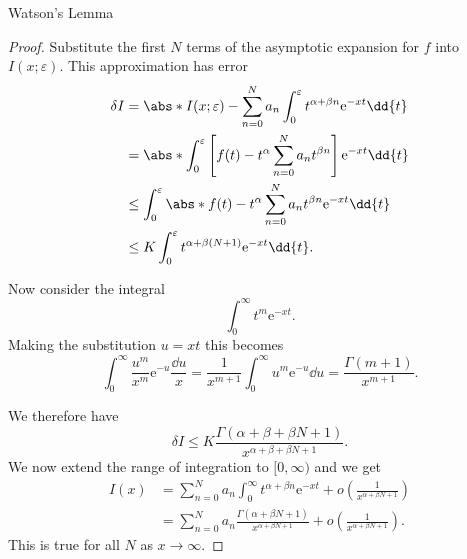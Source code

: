 \documentclass[fleqn]{NotesClass}
\newcommand*{\e}{\mathrm{e}}
\begin{document}
\begin{lma}{Watson's Lemma}{}
\begin{proof}
            Substitute the first \(N\) terms of the asymptotic expansion for \(f\) into \(I(x; \varepsilon)\).
            This approximation has error
            \begin{align}
                \delta I &= \abs*{I(x; \varepsilon) - \sum_{n=0}^{N} a_n \int_0^{\varepsilon} t^{\alpha+\beta n}\e^{-xt} \dd{t}}\\
                &= \abs*{\int_0^{\varepsilon} \left[ f(t) - t^\alpha\sum_{n=0}^{N} a_nt^{\beta n} \right]\e^{-xt} \dd{t}}\\
                &\le \int_0^\varepsilon \abs*{f(t) - t^{\alpha} \sum_{n=0}^{N} a_nt^{\beta n}}\e^{-xt}\dd{t}\\
                &\le K \int_0^{\varepsilon} t^{\alpha + \beta(N + 1)}\e^{-xt} \dd{t}.
            \end{align}
        
            Now consider the integral
            \begin{equation}
                \int_0^{\infty} t^m\e^{-xt}.
            \end{equation}
            Making the substitution \(u = xt\) this becomes
            \begin{equation}
                \int_0^{\infty} \frac{u^m}{x^m} \e^{-u} \frac{\dd{u}}{x} = \frac{1}{x^{m+1}} \int_0^{\infty} u^m\e^{-u} \dd{u} = \frac{\Gamma(m + 1)}{x^{m+1}}.
            \end{equation}
        
            We therefore have
            \begin{equation}
                \delta I \le K \frac{\Gamma(\alpha + \beta + \beta N + 1)}{x^{\alpha + \beta + \beta N + 1}}.
            \end{equation}
            We now extend the range of integration to \([0, \infty)\) and we get
            \begin{align}
                I(x) &= \sum_{n=0}^{N} a_n \int_0^\infty t^{\alpha + \beta n} \e^{-xt} + o\left( \frac{1}{x^{\alpha + \beta N + 1}} \right)\\
                &= \sum_{n=0}^{N} a_n \frac{\Gamma(\alpha + \beta N + 1)}{x^{\alpha + \beta N + 1}} + o\left( \frac{1}{x^{\alpha + \beta N + 1}} \right).
            \end{align}
            This is true for all \(N\) as \(x \to \infty\).
        \end{proof}
    \end{lma}
    
\end{document}

